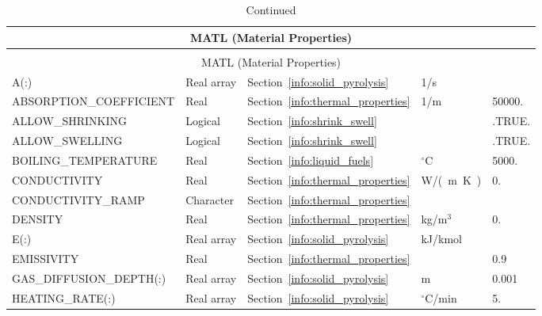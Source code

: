 \documentclass[11pt]{book}
\begin{document}
\begin{longtable}{@{\extracolsep{\fill}}|l|l|l|l|l|}
\caption[Material properties ({\ct MATL} namelist group)]{For more information see Section~\ref{info:MATL}.}
\label{tbl:MATL} \\
\hline
\multicolumn{5}{|c|}{{\ct MATL} (Material Properties)} \\
\hline \hline
\endfirsthead
\caption[]{Continued} \\
\hline
\multicolumn{5}{|c|}{{\ct MATL} (Material Properties)} \\
\hline \hline
\endhead
{\ct A(:)}                          & Real array    & Section~\ref{info:solid_pyrolysis}    &    1/s            &        \\ \hline
{\ct ABSORPTION\_COEFFICIENT}       & Real          & Section~\ref{info:thermal_properties} &    1/m            & 50000. \\ \hline
{\ct ALLOW\_SHRINKING}              & Logical       & Section~\ref{info:shrink_swell}       &                   & {\ct.TRUE.} \\ \hline
{\ct ALLOW\_SWELLING}               & Logical       & Section~\ref{info:shrink_swell}       &                   & {\ct.TRUE.} \\ \hline
{\ct BOILING\_TEMPERATURE}          & Real          & Section~\ref{info:liquid_fuels}       & $^\circ$C         & 5000.  \\ \hline
{\ct CONDUCTIVITY}                  & Real          & Section~\ref{info:thermal_properties} & \si{W/(m.K)}      & 0.     \\ \hline
{\ct CONDUCTIVITY\_RAMP}            & Character     & Section~\ref{info:thermal_properties} &                   &        \\ \hline
{\ct DENSITY}                       & Real          & Section~\ref{info:thermal_properties} & kg/m$^3$          & 0.     \\ \hline
{\ct E(:)}                          & Real array    & Section~\ref{info:solid_pyrolysis}    & kJ/kmol           &        \\ \hline
{\ct EMISSIVITY    }                & Real          & Section~\ref{info:thermal_properties} &                   & 0.9    \\ \hline
{\ct GAS\_DIFFUSION\_DEPTH(:) }     & Real array    & Section~\ref{info:solid_pyrolysis}    & m                 & 0.001  \\ \hline
{\ct HEATING\_RATE(:)}              & Real array    & Section~\ref{info:solid_pyrolysis}    & $^\circ$C/min     & 5.     \\ \hline

\end{longtable}
\end{document}
